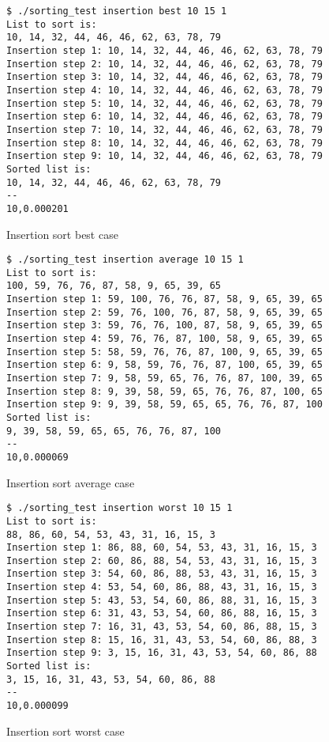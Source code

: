 \documentclass{article}
\begin{document}
\begin{figure}[H]
	\centering
	\begin{BVerbatim}
$ ./sorting_test insertion best 10 15 1
List to sort is:
10, 14, 32, 44, 46, 46, 62, 63, 78, 79
Insertion step 1: 10, 14, 32, 44, 46, 46, 62, 63, 78, 79
Insertion step 2: 10, 14, 32, 44, 46, 46, 62, 63, 78, 79
Insertion step 3: 10, 14, 32, 44, 46, 46, 62, 63, 78, 79
Insertion step 4: 10, 14, 32, 44, 46, 46, 62, 63, 78, 79
Insertion step 5: 10, 14, 32, 44, 46, 46, 62, 63, 78, 79
Insertion step 6: 10, 14, 32, 44, 46, 46, 62, 63, 78, 79
Insertion step 7: 10, 14, 32, 44, 46, 46, 62, 63, 78, 79
Insertion step 8: 10, 14, 32, 44, 46, 46, 62, 63, 78, 79
Insertion step 9: 10, 14, 32, 44, 46, 46, 62, 63, 78, 79
Sorted list is:
10, 14, 32, 44, 46, 46, 62, 63, 78, 79
--
10,0.000201
	\end{BVerbatim}
	\caption{Insertion sort best case}
	\label{ins-best-test}
\end{figure}

\begin{figure}[H]
	\centering
	\begin{BVerbatim}
$ ./sorting_test insertion average 10 15 1
List to sort is:
100, 59, 76, 76, 87, 58, 9, 65, 39, 65
Insertion step 1: 59, 100, 76, 76, 87, 58, 9, 65, 39, 65
Insertion step 2: 59, 76, 100, 76, 87, 58, 9, 65, 39, 65
Insertion step 3: 59, 76, 76, 100, 87, 58, 9, 65, 39, 65
Insertion step 4: 59, 76, 76, 87, 100, 58, 9, 65, 39, 65
Insertion step 5: 58, 59, 76, 76, 87, 100, 9, 65, 39, 65
Insertion step 6: 9, 58, 59, 76, 76, 87, 100, 65, 39, 65
Insertion step 7: 9, 58, 59, 65, 76, 76, 87, 100, 39, 65
Insertion step 8: 9, 39, 58, 59, 65, 76, 76, 87, 100, 65
Insertion step 9: 9, 39, 58, 59, 65, 65, 76, 76, 87, 100
Sorted list is:
9, 39, 58, 59, 65, 65, 76, 76, 87, 100
--
10,0.000069
	\end{BVerbatim}
	\caption{Insertion sort average case}
	\label{ins-avg-test}
\end{figure}

\begin{figure}[H]
	\centering
	\begin{BVerbatim}
$ ./sorting_test insertion worst 10 15 1
List to sort is:
88, 86, 60, 54, 53, 43, 31, 16, 15, 3
Insertion step 1: 86, 88, 60, 54, 53, 43, 31, 16, 15, 3
Insertion step 2: 60, 86, 88, 54, 53, 43, 31, 16, 15, 3
Insertion step 3: 54, 60, 86, 88, 53, 43, 31, 16, 15, 3
Insertion step 4: 53, 54, 60, 86, 88, 43, 31, 16, 15, 3
Insertion step 5: 43, 53, 54, 60, 86, 88, 31, 16, 15, 3
Insertion step 6: 31, 43, 53, 54, 60, 86, 88, 16, 15, 3
Insertion step 7: 16, 31, 43, 53, 54, 60, 86, 88, 15, 3
Insertion step 8: 15, 16, 31, 43, 53, 54, 60, 86, 88, 3
Insertion step 9: 3, 15, 16, 31, 43, 53, 54, 60, 86, 88
Sorted list is:
3, 15, 16, 31, 43, 53, 54, 60, 86, 88
--
10,0.000099
	\end{BVerbatim}
	\caption{Insertion sort worst case}
	\label{ins-worst-test}
\end{figure}
\end{document}
